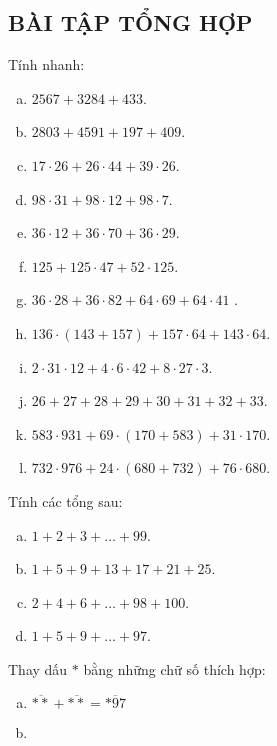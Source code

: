 \begin{bt}
\subsection{BÀI TẬP TỔNG HỢP}
\end{bt}   \begin{bt}
Tính nhanh:
\begin{enumerate}[a)]
\item $2567 + 3284 + 433$.
\item $2803 + 4591 + 197 + 409$.
\item $17\cdot 26+26\cdot 44+39\cdot 26$. 
\item $98 \cdot 31 + 98 \cdot 12 + 98 \cdot 7$.
\item $36 \cdot 12 + 36 \cdot 70 + 36 \cdot 29$.
\item $125 + 125 \cdot 47 + 52 \cdot 125$.
\item $36\cdot 28+36\cdot 82+64\cdot 69+64\cdot 41$ .
\item $136\cdot \left( 143+157 \right)+157\cdot 64+143\cdot 64$.
\item $2\cdot 31\cdot 12+4\cdot 6\cdot 42+8\cdot 27\cdot 3$.
\item $26+27+28+29+30+31+32+33$.
\item $583\cdot 931+69\cdot \left( 170+583 \right)+31\cdot 170$.
\item $732\cdot 976+24\cdot \left( 680+732 \right)+76\cdot 680$.
\end{enumerate} 
\end{bt}   \begin{bt} Tính các tổng sau:
\begin{enumerate}[a)]
\item	$1+2+3+\ldots +99$.
\item	$1+5+9+13+17+21+25$. 
\item	$2+4+6+\ldots +98+100$. 			 
\item	$1+5+9+\ldots +97$.
\end{enumerate} 
\end{bt}   \begin{bt} 
Thay dấu $\ast$ bằng những chữ số thích hợp:
\begin{enumerate}[a)]
\item $\overline {\ast\ast}  + \overline {\ast\ast}  = \overline {\ast 97} $
\item {}
\end{enumerate}
\end{bt}
